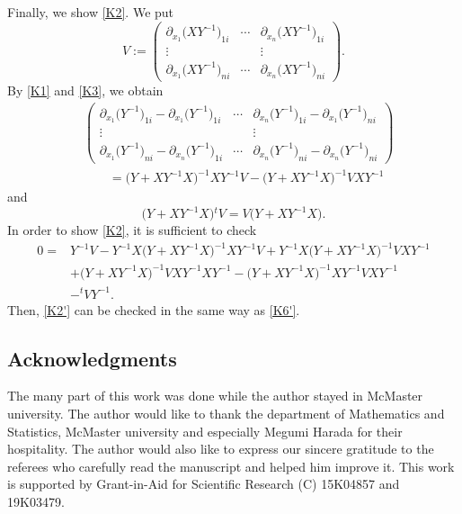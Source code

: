 \documentclass[pdftex]{sigma}
\numberwithin{equation}{section}
\begin{document}
Finally, we show \eqref{K2}. We put
\[
V:=
\begin{pmatrix}
\partial_{x_1}\bigl(XY^{-1}\bigr)_{1i} & \cdots & \partial_{x_n}\bigl(XY^{-1}\bigr)_{1i} \\
\vdots & & \vdots \\
\partial_{x_1}\bigl(XY^{-1}\bigr)_{ni} & \cdots & \partial_{x_n}\bigl(XY^{-1}\bigr)_{ni}
\end{pmatrix}.
\]
By \eqref{K1} and \eqref{K3}, we obtain
\begin{align*}
&\begin{pmatrix}
\partial_{x_1}\bigl(Y^{-1}\bigr)_{1i}-\partial_{x_1}\bigl(Y^{-1}\bigr)_{1i} & \cdots & \partial_{x_n}\bigl(Y^{-1}\bigr)_{1i}-\partial_{x_1}\bigl(Y^{-1}\bigr)_{ni} \\
\vdots & & \vdots \\
\partial_{x_1}\bigl(Y^{-1}\bigr)_{ni}-\partial_{x_n}\bigl(Y^{-1}\bigr)_{1i} & \cdots & \partial_{x_n}\bigl(Y^{-1}\bigr)_{ni}-\partial_{x_n}\bigl(Y^{-1}\bigr)_{ni}
\end{pmatrix}\\
&\qquad=\bigl(Y+XY^{-1}X\bigr)^{-1}XY^{-1}V-\bigl(Y+XY^{-1}X\bigr)^{-1}VXY^{-1}
\end{align*}
and
\[
\bigl(Y+XY^{-1}X\bigr){}^tV=V\bigl(Y+XY^{-1}X\bigr).
\]
In order to show \eqref{K2}, it is sufficient to check
\begin{align}
0={}&Y^{-1}V-Y^{-1}X\bigl(Y+XY^{-1}X\bigr)^{-1}XY^{-1}V+Y^{-1}X\bigl(Y+XY^{-1}X\bigr)^{-1}VXY^{-1}\nonumber\\
&+\bigl(Y+XY^{-1}X\bigr)^{-1}VXY^{-1}XY^{-1}-\bigl(Y+XY^{-1}X\bigr)^{-1}XY^{-1}VXY^{-1}\nonumber\\
&-{}^tVY^{-1}.\label{K2'}
\end{align}
Then, \eqref{K2'} can be checked in the same way as \eqref{K6'}.


\subsection*{Acknowledgments}
The many part of this work was done while the author stayed in McMaster university. The author would like to thank the department of Mathematics and Statistics, McMaster university and especially Megumi Harada for their hospitality. The author would also like to express our sincere gratitude to the referees who carefully read the manuscript and helped him improve it. This work is supported by Grant-in-Aid for Scientific Research (C) 15K04857 and 19K03479.
\end{document}
